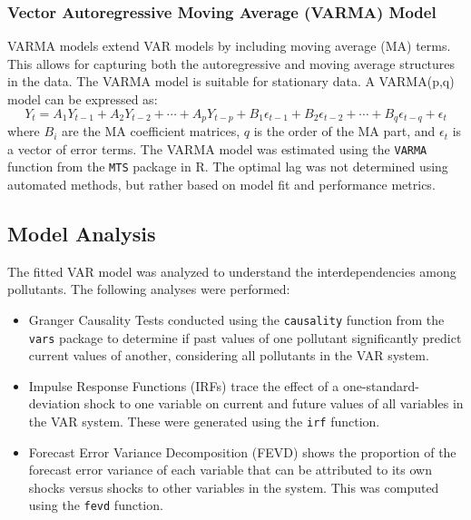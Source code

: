 \documentclass[fleqn,10pt]{SelfArx} %
\begin{document}
\subsubsection{Vector Autoregressive Moving Average (VARMA) Model}
VARMA models extend VAR models by including moving average (MA) terms. This allows for capturing both the autoregressive and moving average structures in the data. The VARMA model is suitable for stationary data. A VARMA(p,q) model can be expressed as:
\begin{equation}
Y_t = A_1 Y_{t-1} + A_2 Y_{t-2} + \cdots + A_p Y_{t-p} + B_1 \epsilon_{t-1} + B_2 \epsilon_{t-2} + \cdots + B_q \epsilon_{t-q} + \epsilon_t
\end{equation}
where \(B_i\) are the MA coefficient matrices, \(q\) is the order of the MA part, and \(\epsilon_t\) is a vector of error terms.
The VARMA model was estimated using the \texttt{VARMA} function from the \texttt{MTS} package in R. The optimal lag was not determined using automated methods, but rather based on model fit and performance metrics.

\subsection{Model Analysis}

The fitted VAR model was analyzed to understand the interdependencies among pollutants. The following analyses were performed:
\begin{itemize}
    \item Granger Causality Tests conducted using the \texttt{causality} function from the \texttt{vars} package to determine if past values of one pollutant significantly predict current values of another, considering all pollutants in the VAR system.
    \item Impulse Response Functions (IRFs) trace the effect of a one-standard-deviation shock to one variable on current and future values of all variables in the VAR system. These were generated using the \texttt{irf} function.
    \item Forecast Error Variance Decomposition (FEVD) shows the proportion of the forecast error variance of each variable that can be attributed to its own shocks versus shocks to other variables in the system. This was computed using the \texttt{fevd} function.
\end{itemize}
\end{document}
